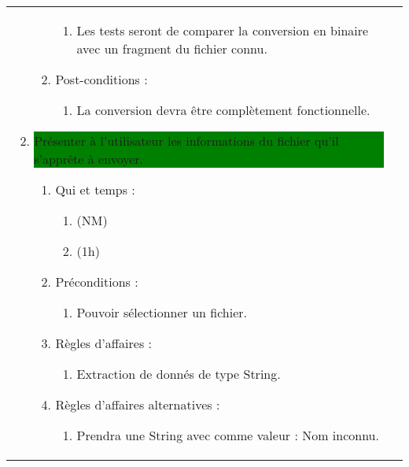 \begin{longtable}{|l|p{}|}
\begin{enumerate}[label*=\arabic*.]
\begin{enumerate}[label*=\arabic*.]
\begin{enumerate}[label*=\arabic*.]
                                    \item Les tests seront de comparer la conversion en binaire avec un fragment du fichier connu.
                                \end{enumerate}
                                \item Post-conditions :
                                \begin{enumerate}[label*=\arabic*.]
                                    \item La conversion devra être complètement fonctionnelle.
                                \end{enumerate}
                            \end{enumerate}
             \item \colorbox{Green}{\parbox{13cm}{Présenter à l’utilisateur les informations du fichier qu’il s’apprête à envoyer.}}
                \begin{enumerate}[label*=\arabic*.]
                                \item Qui et temps :
                                \begin{enumerate}[label*=\arabic*.]
                                    \item (NM)
                                    \item (1h)
                                \end{enumerate}
                                \item Préconditions :
                                \begin{enumerate}[label*=\arabic*.]
                                    \item Pouvoir sélectionner un fichier.
                                \end{enumerate}
                                \item Règles d'affaires :
                                \begin{enumerate}[label*=\arabic*.]
                                    \item Extraction de donnés de type String.
                                \end{enumerate}
                                \item Règles d'affaires alternatives :
                                \begin{enumerate}[label*=\arabic*.]
                                    \item Prendra une String avec comme valeur : Nom inconnu.

\end{enumerate}
\end{enumerate}
\end{enumerate}
\end{longtable}
